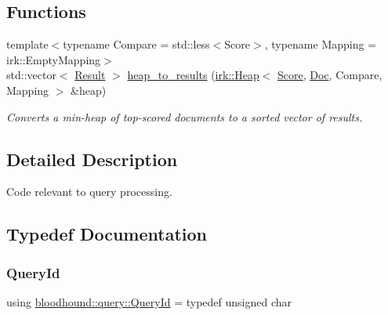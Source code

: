 \subsection*{Functions}
\begin{DoxyCompactItemize}
\item 
{\footnotesize template$<$typename Compare  = std\+::less$<$\+Score$>$, typename Mapping  = irk\+::\+Empty\+Mapping$>$ }\\std\+::vector$<$ \mbox{\hyperlink{structbloodhound_1_1query_1_1Result}{Result}} $>$ \mbox{\hyperlink{namespacebloodhound_1_1query_a0437e798097dea85146811bdec5cc5fb}{heap\+\_\+to\+\_\+results}} (\mbox{\hyperlink{classirk_1_1Heap}{irk\+::\+Heap}}$<$ \mbox{\hyperlink{structbloodhound_1_1Score}{Score}}, \mbox{\hyperlink{structbloodhound_1_1Doc}{Doc}}, Compare, Mapping $>$ \&heap)
\begin{DoxyCompactList}\small\item\em Converts a min-\/heap of top-\/scored documents to a sorted vector of results. \end{DoxyCompactList}\end{DoxyCompactItemize}


\subsection{Detailed Description}
Code relevant to query processing. 

\subsection{Typedef Documentation}
\mbox{\label{namespacebloodhound_1_1query_aa67214af106292b2483995adea986b08}} 
\subsubsection{\texorpdfstring{Query\+Id}{QueryId}}
{\footnotesize\ttfamily using \mbox{\hyperlink{namespacebloodhound_1_1query_aa67214af106292b2483995adea986b08}{bloodhound\+::query\+::\+Query\+Id}} = typedef unsigned char}

\mbox{\label{namespacebloodhound_1_1query_afd658a38b784a8187f8782905cb901e6}} 
